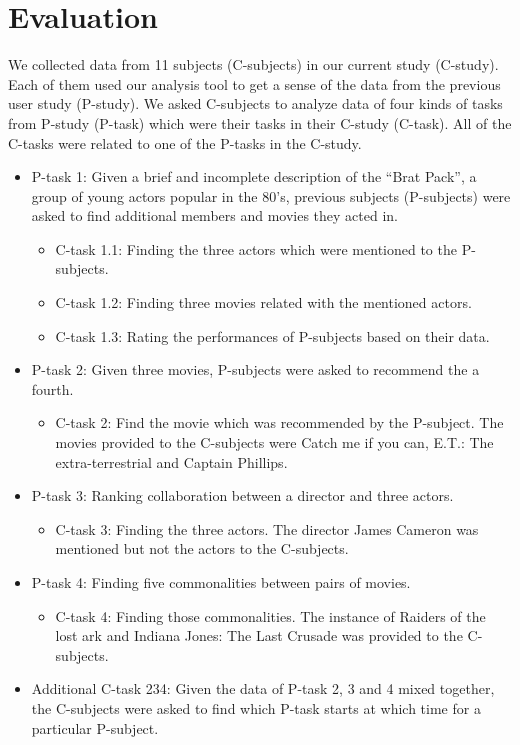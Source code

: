 \section{Evaluation}
\label{sec:Evaluation}
We collected data from 11 subjects (C-subjects) in our current study (C-study). Each of them used our analysis tool to get a sense of the data from the previous user study (P-study). We asked C-subjects to analyze data of four kinds of tasks from P-study (P-task) which were their tasks in their C-study (C-task). All of the C-tasks were related to one of the P-tasks in the C-study.  
\begin{itemize}
	\item P-task 1: Given a brief and incomplete description of the ``Brat Pack'', a group of young actors popular in the 80's, previous subjects (P-subjects) were asked to find additional members and movies they acted in. 
		\begin{itemize}
			\item C-task 1.1:  Finding the three actors which were mentioned to the P-subjects.
			\item C-task 1.2:  Finding three movies related with the mentioned actors.
			\item C-task 1.3:  Rating the performances of P-subjects based on their data.
		\end{itemize}
	\item P-task 2: Given three movies, P-subjects were asked to recommend the a fourth. 
		\begin{itemize}
				\item C-task 2: Find the movie which was recommended by the P-subject. The movies provided to the C-subjects were Catch me if you can, E.T.: The extra-terrestrial and Captain Phillips.
			\end{itemize}
	\item P-task 3: Ranking collaboration between a director and three actors. 
		\begin{itemize}
				\item C-task 3: Finding the three actors. The director James Cameron was mentioned but not the actors to the C-subjects. 
			\end{itemize}
	\item P-task 4: Finding five commonalities between pairs of movies. 
			\begin{itemize}
				\item C-task 4: Finding those commonalities. The instance of Raiders of the lost ark and Indiana Jones: The Last Crusade was provided to the C-subjects. 
			\end{itemize}
	\item Additional C-task 234: Given the data of P-task 2, 3 and 4 mixed together, the C-subjects were asked to find which P-task starts at which time for a particular P-subject.
\end{itemize}

